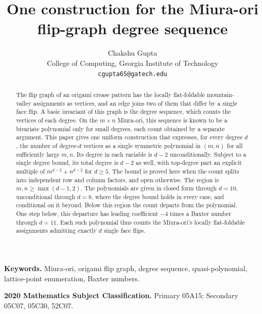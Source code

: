 \documentclass[11pt]{article}
\title{One construction for the Miura-ori flip-graph degree sequence}
\author{Chakshu Gupta\\
  \small College of Computing, Georgia Institute of Technology\\
  \small \texttt{cgupta65@gatech.edu}}
\date{}
\theoremstyle{definition}
\theoremstyle{remark}
\begin{document}
\maketitle

\begin{abstract}
The flip graph of an origami crease pattern has the locally flat-foldable
mountain-valley assignments as vertices, and an edge joins two of them that differ
by a single face flip. A basic invariant of this graph is the degree sequence,
which counts the vertices of each degree. On the $m\times n$ Miura-ori,
this sequence is known to be a bivariate polynomial only for small degrees,
each count obtained by a separate argument. This paper gives
one uniform construction that expresses, for every degree $d$, the number of
degree-$d$ vertices as a single symmetric polynomial in $(m,n)$ for all
sufficiently large $m,n$. Its degree in each variable is $d-2$ unconditionally.
Subject to a single degree bound, its total degree is $d-2$ as well,
with top-degree part an explicit multiple of
$m^{d-2}+n^{d-2}$ for $d\ge5$. The bound is proved here when the count splits into
independent row and column factors, and open otherwise. The
region is $m,n\ge\max(d-1,2)$. The
polynomials are given in closed form through $d=10$, unconditional through $d=8$,
where the degree bound holds in every case, and conditional on it beyond.
Below this region the count departs from the polynomial. One step below, this
departure has leading coefficient $-4$ times a Baxter number through $d=11$. Each
such polynomial thus counts the Miura-ori's locally flat-foldable assignments
admitting exactly $d$ single face flips.
\end{abstract}

\medskip
\noindent\textbf{Keywords.}
Miura-ori, origami flip graph, degree sequence, quasi-polynomial,
lattice-point enumeration, Baxter numbers.

\noindent\textbf{2020 Mathematics Subject Classification.}
Primary 05A15; Secondary 05C07, 05C30, 52C07.

\end{document}
